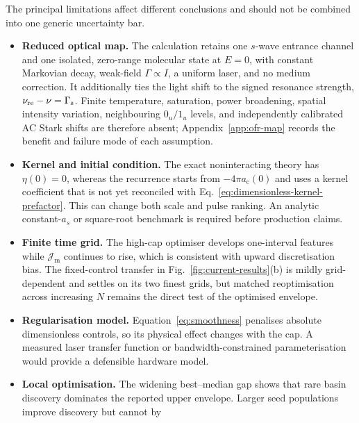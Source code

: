 \documentclass[9pt,a4paper,twocolumn,twoside]{rho-class/rho}
\newcommand{\ac}{a_{\mathrm{c}}}
\newcommand{\Jmol}{\mathcal{J}_{\mathrm{m}}}
\begin{document}
        The principal limitations affect different conclusions and should not be
        combined into one generic uncertainty bar.
        \begin{itemize}
            \item \textbf{Reduced optical map.} The calculation retains one
            $s$-wave entrance channel and one isolated, zero-range molecular
            state at $E=0$, with constant Markovian decay, weak-field
            $\Gamma\propto I$, a uniform laser, and no medium correction.  It
            additionally ties the light shift to the signed resonance strength,
            $\nu_{\rm re}-\nu=\Gamma_{\rm s}$.  Finite temperature, saturation,
            power broadening, spatial intensity variation, neighbouring
            $0_u/1_u$ levels, and independently calibrated AC Stark shifts are
            therefore absent; Appendix~\ref{app:ofr-map} records the benefit and
            failure mode of each assumption.
            \item \textbf{Kernel and initial condition.} The exact
            noninteracting theory has $\eta(0)=0$, whereas the recurrence starts
            from $-4\pi\ac(0)$ and uses a kernel coefficient that is not yet
            reconciled with Eq.~\eqref{eq:dimensionless-kernel-prefactor}. This
            can change both scale and pulse ranking. An analytic constant-$a_s$
            or square-root benchmark is required before production claims.
            \item \textbf{Finite time grid.} The high-cap optimiser develops
            one-interval features while $\Jmol$ continues to rise, which is
            consistent with upward discretisation bias. The fixed-control
            transfer in Fig.~\ref{fig:current-results}(b) is mildly
            grid-dependent and settles on its two finest grids, but matched
            reoptimisation across increasing $N$ remains the direct test of the
            optimised envelope.
            \item \textbf{Regularisation model.} Equation~\eqref{eq:smoothness}
            penalises absolute dimensionless controls, so its physical effect
            changes with the cap. A measured laser transfer function or
            bandwidth-constrained parameterisation would provide a defensible
            hardware model.
            \item \textbf{Local optimisation.} The widening best--median gap
            shows that rare basin discovery dominates the reported upper
            envelope. Larger seed populations improve discovery but cannot by

\end{itemize}
\end{document}
